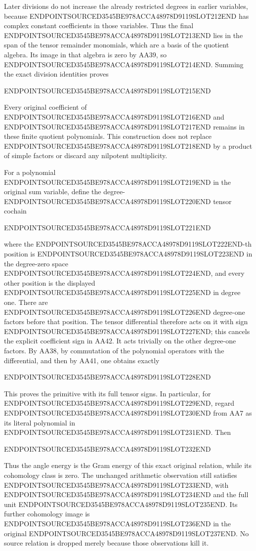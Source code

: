Later divisions do not increase the already restricted degrees in earlier variables, because ENDPOINTSOURCED3545BE978ACCA48978D9119SLOT212END has complex constant coefficients in those variables. Thus the final ENDPOINTSOURCED3545BE978ACCA48978D9119SLOT213END lies in the span of the tensor remainder monomials, which are a basis of the quotient algebra. Its image in that algebra is zero by AA39, so ENDPOINTSOURCED3545BE978ACCA48978D9119SLOT214END. Summing the exact division identities proves

ENDPOINTSOURCED3545BE978ACCA48978D9119SLOT215END

Every original coefficient of ENDPOINTSOURCED3545BE978ACCA48978D9119SLOT216END and ENDPOINTSOURCED3545BE978ACCA48978D9119SLOT217END remains in these finite quotient polynomials. This construction does not replace ENDPOINTSOURCED3545BE978ACCA48978D9119SLOT218END by a product of simple factors or discard any nilpotent multiplicity.

For a polynomial ENDPOINTSOURCED3545BE978ACCA48978D9119SLOT219END in the original sum variable, define the degree-ENDPOINTSOURCED3545BE978ACCA48978D9119SLOT220END tensor cochain

ENDPOINTSOURCED3545BE978ACCA48978D9119SLOT221END

where the ENDPOINTSOURCED3545BE978ACCA48978D9119SLOT222END-th position is ENDPOINTSOURCED3545BE978ACCA48978D9119SLOT223END in the degree-zero space ENDPOINTSOURCED3545BE978ACCA48978D9119SLOT224END, and every other position is the displayed ENDPOINTSOURCED3545BE978ACCA48978D9119SLOT225END in degree one. There are ENDPOINTSOURCED3545BE978ACCA48978D9119SLOT226END degree-one factors before that position. The tensor differential therefore acts on it with sign ENDPOINTSOURCED3545BE978ACCA48978D9119SLOT227END; this cancels the explicit coefficient sign in AA42. It acts trivially on the other degree-one factors. By AA38, by commutation of the polynomial operators with the differential, and then by AA41, one obtains exactly

ENDPOINTSOURCED3545BE978ACCA48978D9119SLOT228END

This proves the primitive with its full tensor signs. In particular, for ENDPOINTSOURCED3545BE978ACCA48978D9119SLOT229END, regard ENDPOINTSOURCED3545BE978ACCA48978D9119SLOT230END from AA7 as its literal polynomial in ENDPOINTSOURCED3545BE978ACCA48978D9119SLOT231END. Then

ENDPOINTSOURCED3545BE978ACCA48978D9119SLOT232END

Thus the angle energy is the Gram energy of this exact original relation, while its cohomology class is zero. The unchanged arithmetic observation still satisfies ENDPOINTSOURCED3545BE978ACCA48978D9119SLOT233END, with ENDPOINTSOURCED3545BE978ACCA48978D9119SLOT234END and the full unit ENDPOINTSOURCED3545BE978ACCA48978D9119SLOT235END. Its further cohomology image is ENDPOINTSOURCED3545BE978ACCA48978D9119SLOT236END in the original ENDPOINTSOURCED3545BE978ACCA48978D9119SLOT237END. No source relation is dropped merely because those observations kill it.

